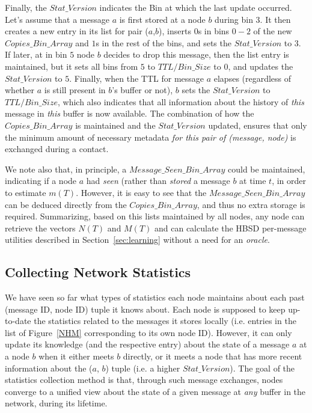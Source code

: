 Finally, the $Stat\_Version$ indicates the Bin at which the last update occurred. Let's assume that a message $a$ is first stored at a node $b$ during bin $3$. It then creates a new entry in its list for pair ($a$,$b$), inserts $0$s in bins $0-2$ of the new $Copies\_Bin\_Array$ and $1$s in the rest of the bins, and sets the $Stat\_Version$ to $3$. If later, at in bin $5$ node $b$ decides to drop this message, then the list entry is maintained, but it sets all bins from $5$ to $TTL/Bin\_Size$ to $0$, and updates the $Stat\_Version$ to $5$. Finally, when the TTL for message $a$ elapses (regardless of whether $a$ is still present in $b$'s buffer or not), $b$ sets the $Stat\_Version$ to $TTL/Bin\_Size$, which also indicates that all information about the history of \emph{this} message in \emph{this} buffer is now available. The combination of how the $Copies\_Bin\_Array$ is maintained and the $Stat\_Version$ updated, ensures that only the minimum amount of necessary metadata \emph{for this pair of (message, node)} is exchanged during a contact.

We note also that, in principle, a $Message\_Seen\_Bin\_Array$ could be maintained, indicating if a node $a$ had \emph{seen} (rather than \emph{stored} a message $b$ at time $t$, in order to estimate $m(T)$. However, it is easy to see that the $Message\_Seen\_Bin\_Array$ can be deduced directly from the $Copies\_Bin\_Array$, and thus no extra storage is required.
Summarizing, based on this lists maintained by all nodes, any node can retrieve the vectors $N(T)$ and $M(T)$ and can calculate the HBSD per-message utilities described in Section~\ref{sec:learning} without a need for an \emph{oracle}.

\subsection{Collecting Network Statistics}
\label{NHCM}

We have seen so far what types of statistics each node maintains about each past (message ID, node ID) tuple it knows about. Each node is supposed to keep up-to-date the statistics related to the messages it stores locally (i.e. entries in the list of Figure~\ref{NHM} corresponding to its own node ID). However, it can only update its knowledge (and the respective entry) about the state of a message $a$ at a node $b$ when it either meets $b$ directly, or it meets a node that has more recent information about the ($a$, $b$) tuple (i.e. a higher $Stat\_Version$). The goal of the statistics collection method is that, through such message exchanges, nodes converge to a unified view about the state of a given message at \emph{any} buffer in the network, during its lifetime.

